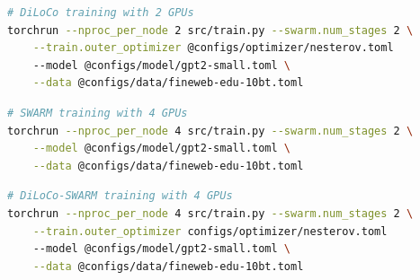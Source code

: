 \documentclass{article}
\begin{document}
\begin{lstlisting}[language=bash]
# DiLoCo training with 2 GPUs
torchrun --nproc_per_node 2 src/train.py --swarm.num_stages 2 \
    --train.outer_optimizer @configs/optimizer/nesterov.toml
    --model @configs/model/gpt2-small.toml \
    --data @configs/data/fineweb-edu-10bt.toml
\end{lstlisting}

\begin{lstlisting}[language=bash]
# SWARM training with 4 GPUs
torchrun --nproc_per_node 4 src/train.py --swarm.num_stages 2 \
    --model @configs/model/gpt2-small.toml \
    --data @configs/data/fineweb-edu-10bt.toml
\end{lstlisting}

\begin{lstlisting}[language=bash]
# DiLoCo-SWARM training with 4 GPUs
torchrun --nproc_per_node 4 src/train.py --swarm.num_stages 2 \
    --train.outer_optimizer configs/optimizer/nesterov.toml
    --model @configs/model/gpt2-small.toml \
    --data @configs/data/fineweb-edu-10bt.toml
\end{lstlisting}

% 
% 
\end{document}
